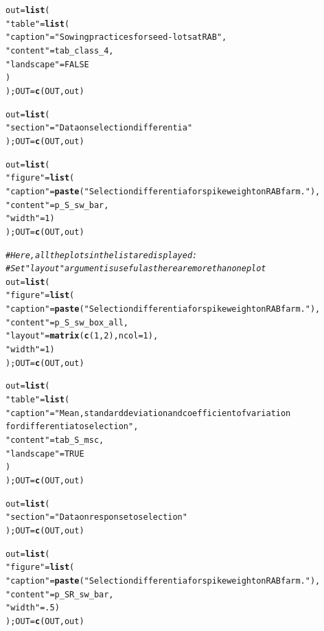 \documentclass{article}\usepackage[]{graphicx}\usepackage[]{color}
\makeatletter
\newcommand{\hlnum}[1]{\textcolor[rgb]{0.686,0.059,0.569}{#1}}%
\newcommand{\hlstr}[1]{\textcolor[rgb]{0.192,0.494,0.8}{#1}}%
\newcommand{\hlcom}[1]{\textcolor[rgb]{0.678,0.584,0.686}{\textit{#1}}}%
\newcommand{\hlstd}[1]{\textcolor[rgb]{0.345,0.345,0.345}{#1}}%
\newcommand{\hlkwb}[1]{\textcolor[rgb]{0.69,0.353,0.396}{#1}}%
\newcommand{\hlkwc}[1]{\textcolor[rgb]{0.333,0.667,0.333}{#1}}%
\newcommand{\hlkwd}[1]{\textcolor[rgb]{0.737,0.353,0.396}{\textbf{#1}}}%
\newenvironment{kframe}{%
 \def\at@end@of@kframe{}%
 \ifinner\ifhmode%
  \def\at@end@of@kframe{\end{minipage}}%
  \begin{minipage}{\columnwidth}%
 \fi\fi%
 \def\FrameCommand##1{\hskip\@totalleftmargin \hskip-\fboxsep
 \colorbox{shadecolor}{##1}\hskip-\fboxsep
     \hskip-\linewidth \hskip-\@totalleftmargin \hskip\columnwidth}%
 \MakeFramed {\advance\hsize-\width
   \@totalleftmargin\z@ \linewidth\hsize
   \@setminipage}}%
 {\par\unskip\endMakeFramed%
 \at@end@of@kframe}
\newenvironment{knitrout}{}{} %
\makeatother
\begin{document}
\begin{itemize}
\begin{knitrout}
\begin{kframe}
\begin{alltt}
\hlstd{out} \hlkwb{=} \hlkwd{list}\hlstd{(}
        \hlstr{"table"} \hlstd{=} \hlkwd{list}\hlstd{(}
                \hlstr{"caption"} \hlstd{=} \hlstr{"Sowing practices for seed-lots at RAB"}\hlstd{,}
                \hlstr{"content"} \hlstd{= tab_class_4,}
                \hlstr{"landscape"} \hlstd{=} \hlnum{FALSE}
                \hlstd{)}
        \hlstd{); OUT} \hlkwb{=} \hlkwd{c}\hlstd{(OUT, out)}


\hlstd{out} \hlkwb{=} \hlkwd{list}\hlstd{(}
        \hlstr{"section"} \hlstd{=} \hlstr{"Data on selection differentia"}
        \hlstd{); OUT} \hlkwb{=} \hlkwd{c}\hlstd{(OUT, out)}

\hlstd{out} \hlkwb{=} \hlkwd{list}\hlstd{(}
        \hlstr{"figure"} \hlstd{=} \hlkwd{list}\hlstd{(}
                \hlstr{"caption"} \hlstd{=} \hlkwd{paste}\hlstd{(}\hlstr{"Selection differentia for spike weight on RAB farm."}\hlstd{),}
                \hlstr{"content"} \hlstd{= p_S_sw_bar,}
                \hlstr{"width"} \hlstd{=} \hlnum{1}\hlstd{)}
        \hlstd{); OUT} \hlkwb{=} \hlkwd{c}\hlstd{(OUT, out)}

\hlcom{# Here, all the plots in the list are displayed:}
\hlcom{# Set "layout" argument is useful as there are more than one plot}
\hlstd{out} \hlkwb{=} \hlkwd{list}\hlstd{(}
        \hlstr{"figure"} \hlstd{=} \hlkwd{list}\hlstd{(}
                \hlstr{"caption"} \hlstd{=} \hlkwd{paste}\hlstd{(}\hlstr{"Selection differentia for spike weight on RAB farm."}\hlstd{),}
                \hlstr{"content"} \hlstd{= p_S_sw_box_all,}
                \hlstr{"layout"} \hlstd{=} \hlkwd{matrix}\hlstd{(}\hlkwd{c}\hlstd{(}\hlnum{1}\hlstd{,}\hlnum{2}\hlstd{),} \hlkwc{ncol} \hlstd{=} \hlnum{1}\hlstd{),}
                \hlstr{"width"} \hlstd{=} \hlnum{1}\hlstd{)}
        \hlstd{); OUT} \hlkwb{=} \hlkwd{c}\hlstd{(OUT, out)}


\hlstd{out} \hlkwb{=} \hlkwd{list}\hlstd{(}
        \hlstr{"table"} \hlstd{=} \hlkwd{list}\hlstd{(}
                \hlstr{"caption"} \hlstd{=} \hlstr{"Mean, standard deviation and coefficient of variation 
		for differentia to selection"}\hlstd{,}
                \hlstr{"content"} \hlstd{= tab_S_msc,}
                \hlstr{"landscape"} \hlstd{=} \hlnum{TRUE}
                \hlstd{)}
        \hlstd{); OUT} \hlkwb{=} \hlkwd{c}\hlstd{(OUT, out)}

\hlstd{out} \hlkwb{=} \hlkwd{list}\hlstd{(}
        \hlstr{"section"} \hlstd{=} \hlstr{"Data on response to selection"}
        \hlstd{); OUT} \hlkwb{=} \hlkwd{c}\hlstd{(OUT, out)}

\hlstd{out} \hlkwb{=} \hlkwd{list}\hlstd{(}
        \hlstr{"figure"} \hlstd{=} \hlkwd{list}\hlstd{(}
                \hlstr{"caption"} \hlstd{=} \hlkwd{paste}\hlstd{(}\hlstr{"Selection differentia for spike weight on RAB farm."}\hlstd{),}
                \hlstr{"content"} \hlstd{= p_SR_sw_bar,}
                \hlstr{"width"} \hlstd{=} \hlnum{.5}\hlstd{)}
        \hlstd{); OUT} \hlkwb{=} \hlkwd{c}\hlstd{(OUT, out)}
\end{alltt}
\end{kframe}
\end{knitrout}



\end{itemize}
\end{document}
